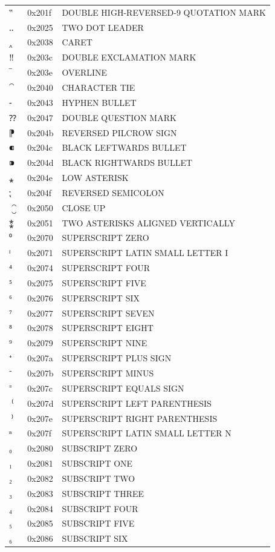 \documentclass[12pt, twoside]{article}
\begin{document}
\begin{longtable}{L{1.0cm} L{2.0cm} >{\footnotesize}L{10cm}}
$‟$&0x201f&DOUBLE HIGH-REVERSED-9 QUOTATION MARK\\
$‥$&0x2025&TWO DOT LEADER\\
$‸$&0x2038&CARET\\
$‼$&0x203c&DOUBLE EXCLAMATION MARK\\
$‾$&0x203e&OVERLINE\\
$⁀$&0x2040&CHARACTER TIE\\
$⁃$&0x2043&HYPHEN BULLET\\
$⁇$&0x2047&DOUBLE QUESTION MARK\\
$⁋$&0x204b&REVERSED PILCROW SIGN\\
$⁌$&0x204c&BLACK LEFTWARDS BULLET\\
$⁍$&0x204d&BLACK RIGHTWARDS BULLET\\
$⁎$&0x204e&LOW ASTERISK\\
$⁏$&0x204f&REVERSED SEMICOLON\\
$⁐$&0x2050&CLOSE UP\\
$⁑$&0x2051&TWO ASTERISKS ALIGNED VERTICALLY\\
$⁰$&0x2070&SUPERSCRIPT ZERO\\
$ⁱ$&0x2071&SUPERSCRIPT LATIN SMALL LETTER I\\
$⁴$&0x2074&SUPERSCRIPT FOUR\\
$⁵$&0x2075&SUPERSCRIPT FIVE\\
$⁶$&0x2076&SUPERSCRIPT SIX\\
$⁷$&0x2077&SUPERSCRIPT SEVEN\\
$⁸$&0x2078&SUPERSCRIPT EIGHT\\
$⁹$&0x2079&SUPERSCRIPT NINE\\
$⁺$&0x207a&SUPERSCRIPT PLUS SIGN\\
$⁻$&0x207b&SUPERSCRIPT MINUS\\
$⁼$&0x207c&SUPERSCRIPT EQUALS SIGN\\
$⁽$&0x207d&SUPERSCRIPT LEFT PARENTHESIS\\
$⁾$&0x207e&SUPERSCRIPT RIGHT PARENTHESIS\\
$ⁿ$&0x207f&SUPERSCRIPT LATIN SMALL LETTER N\\
$₀$&0x2080&SUBSCRIPT ZERO\\
$₁$&0x2081&SUBSCRIPT ONE\\
$₂$&0x2082&SUBSCRIPT TWO\\
$₃$&0x2083&SUBSCRIPT THREE\\
$₄$&0x2084&SUBSCRIPT FOUR\\
$₅$&0x2085&SUBSCRIPT FIVE\\
$₆$&0x2086&SUBSCRIPT SIX\\

\end{longtable}
\end{document}
